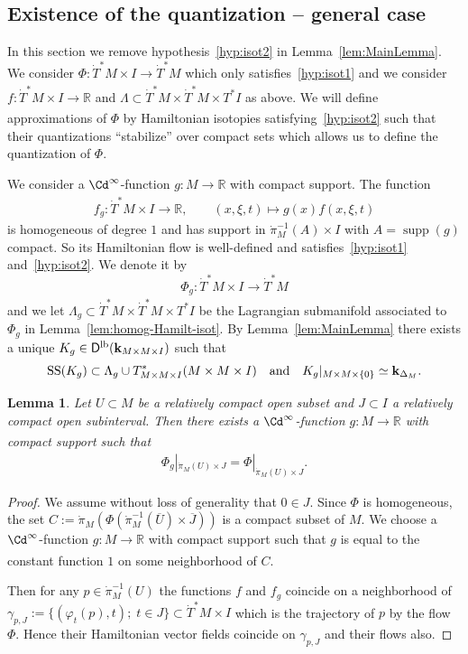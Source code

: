 \documentclass[12pt,leqno]{article}
\newtheorem{lemma}[theorem]{Lemma}
\theoremstyle{definition}
\newcommand{\R}{{\mathbb{R}}}
\def\phi{{\varphi}}
\newcommand{\cor}{{\bf k}}
\renewcommand{\to}[1][]{\xrightarrow[]{#1}}
\newcommand{\opb}[1]{#1^{-1}}
\newcommand{\eqdot}{\mathbin{:=}}
\newcommand{\cl}{\colon}
\newcommand{\eq}{\begin{eqnarray}}
\newcommand{\eneq}{\end{eqnarray}}
\DeclareMathOperator{\supp}{supp}
\newcommand{\Der}[1][]{\mathsf{D}^{#1}}
\newcommand{\Derlb}{\Der[\mathrm{lb}]}
\newcommand{\SSi}{\mathrm{SS}}
\newcommand{\dT}{{\dot{T}}}
\newcommand{\dTM}{{\dT}^*M}
\numberwithin{equation}{section}
\begin{document}
\subsection{Existence of the quantization -- general case}
In this section we remove hypothesis~\eqref{hyp:isot2} in 
Lemma~\ref{lem:MainLemma}.
We consider $\Phi\cl \dTM \times I \to \dTM$ which only
satisfies~\eqref{hyp:isot1} and we consider $f\cl \dTM\times I\to\R$ and
$\Lambda\subset \dTM\times\dTM\times T^*I$ as above.
We will define approximations of $\Phi$ by Hamiltonian isotopies
satisfying~\eqref{hyp:isot2} such that their quantizations ``stabilize''
over compact sets which allows us to define the quantization of $\Phi$.

We consider a $\Cd^\infty$-function $g\cl M\to \R$ with compact support. The
function
$$
f_g \cl \dTM\times I \to\R,
\qquad
(x,\xi,t)  \mapsto g(x) f(x,\xi,t)
$$
is homogeneous of degree $1$ and has support in
$\opb{\dot\pi_M}(A) \times I$ with $A = \supp(g)$ compact.  So its Hamiltonian
flow is well-defined and satisfies~\eqref{hyp:isot1} and~\eqref{hyp:isot2}.
We denote it by
$$
\Phi_g \cl \dTM\times I\to \dTM
$$
and we let $\Lambda_g \subset \dTM \times \dTM \times T^*I$ be the
Lagrangian submanifold associated to $\Phi_g$ in
Lemma~\ref{lem:homog-Hamilt-isot}. By Lemma~\ref{lem:MainLemma} there exists
a unique
$K_g \in \Derlb(\cor_{M\times M\times I})$ such that
$$
\SSi(K_g) \subset \Lambda_g \cup T^*_{M\times M\times I}(M\times M\times I)
\quad\mbox{and}\quad
K_g|_{M\times M\times \{0\}} \simeq \cor_{\Delta_M}.
$$
\begin{lemma}\label{lem:approx-Phi}
Let $U\subset M$ be a relatively compact open subset and $J\subset I$ a
relatively compact open subinterval. Then there exists a $\Cd^\infty$-function
$g\cl M\to \R$ with compact support such that
\eq\label{eq:approx-Phi1}
\Phi_g|_{\dot\pi_M(U) \times J} = \Phi|_{\dot\pi_M(U) \times J}. 
\eneq
\end{lemma}
\begin{proof}
We assume without loss of generality that $0\in J$.
Since $\Phi$ is homogeneous, the set
$C \eqdot
\dot\pi_M( \Phi( \opb{\dot\pi_M}(\overline U) \times \overline J) )$
is a compact subset of $M$.  We choose a $\Cd^\infty$-function $g\cl M\to \R$
with compact support such that $g$ is equal to the constant function
$1$ on some neighborhood of $C$.

Then for any $p \in \opb{\dot\pi_M}(U)$ the functions $f$ and $f_g$ coincide
on a neighborhood of
$\gamma_{p,J} \eqdot \{(\phi_t(p),t); \;t\in J\} \subset \dTM\times I$ which
is the trajectory of $p$ by the flow $\Phi$.  Hence their Hamiltonian vector
fields coincide on $\gamma_{p,J}$ and their flows also.
\end{proof}
\end{document}
